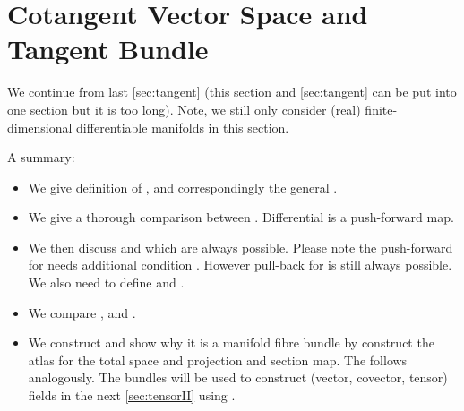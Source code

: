 \documentclass{article}
\begin{document}
\section{Cotangent Vector Space and Tangent Bundle}\label{sec:cotangent}
We continue from last \cref{sec:tangent} (this section and \cref{sec:tangent} can be put into one section but it is too long). Note, we still only consider (real) finite-dimensional differentiable manifolds in this section. 

A summary:
\begin{itemize}[$\blacktriangleright$]
\item  We give definition of , and correspondingly the general .
\item We give a thorough comparison between . Differential is a  push-forward map.
\item We then discuss  and   which are always possible. Please note the  push-forward for   needs additional condition  . However  pull-back for  is  still always possible. We also need  to define  and  . 
\item We compare ,  and .
\item We construct  and show why it is a manifold fibre bundle by construct the atlas for the total space and projection and section map. The  follows analogously. The bundles will be used to construct (vector, covector, tensor) fields in the next \cref{sec:tensorII} using .
\end{itemize}
\end{document}
